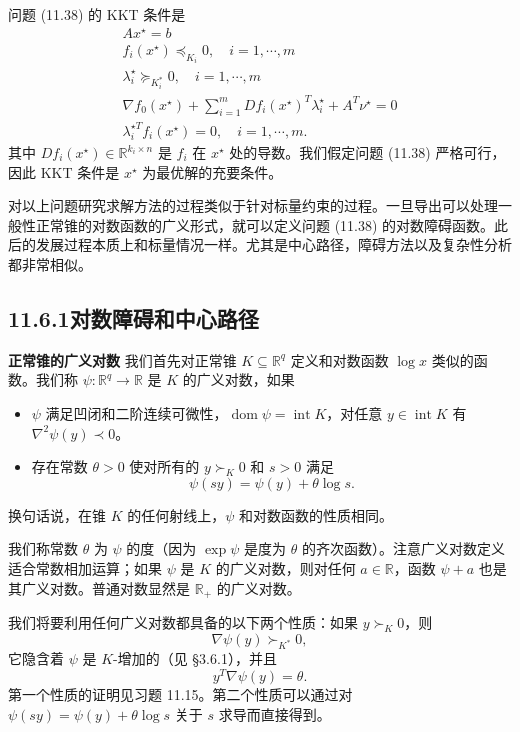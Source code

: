 \documentclass[UTF8,12pt,a4paper,fontset=fandol]{ctexart}
\begin{document}
问题 (11.38) 的 KKT 条件是
\begin{equation}
\begin{gathered}
Ax^\star=b\\
f_i(x^\star)\preceq_{K_i}0,\quad i=1,\cdots,m\\
\lambda_i^\star\succeq_{K_i^\ast}0,\quad i=1,\cdots,m\\
\nabla f_0(x^\star)+\sum_{i=1}^m Df_i(x^\star)^T\lambda_i^\star+A^T\nu^\star=0\\
\lambda_i^{\star T}f_i(x^\star)=0,\quad i=1,\cdots,m.
\end{gathered}
\tag{11.39}
\end{equation}
其中 $Df_i(x^\star)\in\mathbb{R}^{k_i\times n}$ 是 $f_i$ 在 $x^\star$ 处的导数。我们假定问题 (11.38) 严格可行，因此 KKT 条件是 $x^\star$ 为最优解的充要条件。

对以上问题研究求解方法的过程类似于针对标量约束的过程。一旦导出可以处理一般性正常锥的对数函数的广义形式，就可以定义问题 (11.38) 的对数障碍函数。此后的发展过程本质上和标量情况一样。尤其是中心路径，障碍方法以及复杂性分析都非常相似。

\subsection*{11.6.1\quad 对数障碍和中心路径}

\noindent\textbf{正常锥的广义对数}\quad
我们首先对正常锥 $K\subseteq\mathbb{R}^q$ 定义和对数函数 $\log x$ 类似的函数。我们称 $\psi:\mathbb{R}^q\to\mathbb{R}$ 是 $K$ 的广义对数，如果

\begin{itemize}
\item $\psi$ 满足凹闭和二阶连续可微性，$\operatorname{dom}\psi=\operatorname{int}K$，对任意 $y\in\operatorname{int}K$ 有 $\nabla^2\psi(y)\prec 0$。
\item 存在常数 $\theta>0$ 使对所有的 $y\succ_K0$ 和 $s>0$ 满足
\[
\psi(sy)=\psi(y)+\theta\log s.
\]
\end{itemize}

换句话说，在锥 $K$ 的任何射线上，$\psi$ 和对数函数的性质相同。

我们称常数 $\theta$ 为 $\psi$ 的度（因为 $\exp\psi$ 是度为 $\theta$ 的齐次函数）。注意广义对数定义适合常数相加运算；如果 $\psi$ 是 $K$ 的广义对数，则对任何 $a\in\mathbb{R}$，函数 $\psi+a$ 也是其广义对数。普通对数显然是 $\mathbb{R}_+$ 的广义对数。

我们将要利用任何广义对数都具备的以下两个性质：如果 $y\succ_K0$，则
\begin{equation}
\nabla\psi(y)\succ_{K^\ast}0,
\tag{11.40}
\end{equation}
它隐含着 $\psi$ 是 $K$-增加的（见 \S3.6.1），并且
\[
y^T\nabla\psi(y)=\theta.
\]
第一个性质的证明见习题 11.15。第二个性质可以通过对 $\psi(sy)=\psi(y)+\theta\log s$ 关于 $s$ 求导而直接得到。
\end{document}
